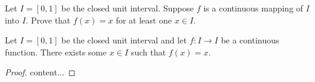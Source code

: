 \begin{exercise}
	Let $I = \left[ 0, 1 \right]$ be the closed unit interval. Suppose $f$ is a continuous mapping of $I$ into $I$. Prove that $f(x) = x$ for at least one $x \in I$.
\end{exercise}
\begin{proposition}
	Let $I = \left[ 0, 1\right]$ be the closed unit interval and let $f : I \to I$ be a continuous function. There exists some $x \in I$ such that $f(x) = x$.
\end{proposition}
\begin{proof}
	content...
	\proofincomplete
\end{proof}
